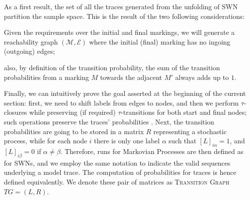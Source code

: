 As a first result, the set of all the traces generated from the unfolding of SWN partition the sample space. This is the result of the two following considerations: \begin{mylist} 
\item Given the requirements over the initial and final markings, we will generate a reachability graph $(\mathcal{M},\mathcal{E})$ where the initial (final) marking has no ingoing (outgoing) edges;
\item also, by definition of the transition probability, the sum of the transition probabilities from a marking $M$ towards the adjacent $M'$ always adds up to $1$.
\end{mylist}

Finally, we can intuitively prove the goal asserted at the beginning of the current section: first, we need to shift labels from edges to nodes, and then we perform $\tau$-closures while preserving (if required) $\tau$-transitions for both start and final nodes; such operations preserve the traces' probabilities \cite{Bergami21}. Next, the transition probabilities are going to be stored in a matrix $R$ representing a stochastic process, while for each node $i$ there is only one label $\alpha$ such that $[L]_{i\alpha}=1$, and $[L]_{i\beta}=0$ if $\alpha\neq\beta$. Therefore, runs for Markovian Processes are then defined as for SWNs, and we employ the same notation to indicate the valid sequences underlying a model trace. The computation of probabilities for traces is hence defined equivalently. We denote these pair of matrices as \textsc{Transition Graph} $TG=(L,R)$.

\endinput
Petri Nets and Generalized Stochastic Petri Nets are well-established formalisms \cite{DBLP:journals/tosem/PolyvyanyySWCM20} for modelling processes \cite{RoggeSoltiAW13} represented in the Petri Net Markup Language, supported by our tool. Due to the lack of space, we refer to \cite{spdwe} for the usual notation over Petri Nets. We restrict our interest to an interesting class of $1$-\textit{bounded} stochastic Petri nets with no timed transitions, namely \textsc{untimed Stochastic Workflow Nets} denoted as $N$. We now sketch the properties of the SWN sketched in \cite{Bergami21}. We consider a single \emph{input} (\emph{output}) marking $m_{in}$ ($m_{out}$) assigning a single token to the input (output) place, and no token elsewhere [\dots].



